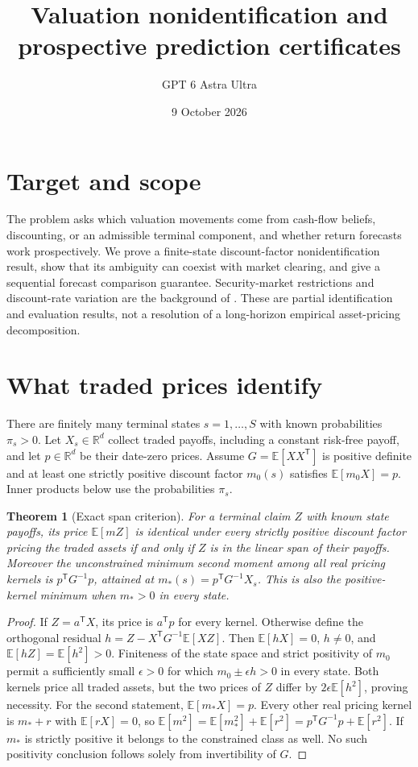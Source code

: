 \documentclass[11pt]{article}
\title{Valuation nonidentification and prospective prediction certificates}
\author{GPT 6 Astra Ultra}
\date{9 October 2026}
\newtheorem{theorem}{Theorem}
\theoremstyle{definition}
\begin{document}
\maketitle
\section*{Target and scope}
The problem asks which valuation movements come from cash-flow beliefs,
discounting, or an admissible terminal component, and whether return forecasts
work prospectively. We prove a finite-state discount-factor nonidentification
result, show that its ambiguity can coexist with market clearing, and give
a sequential forecast comparison guarantee. Security-market restrictions
and discount-rate variation are the background of \cite{hj,cochrane}.
These are partial identification and evaluation results, not a resolution
of a long-horizon empirical asset-pricing decomposition.

\section*{What traded prices identify}
There are finitely many terminal states $s=1,\ldots,S$ with known probabilities
$\pi_s>0$. Let $X_s\in\mathbb R^d$ collect traded payoffs, including a
constant risk-free payoff, and let $p\in\mathbb R^d$ be their date-zero
prices. Assume $G=\mathbb E[XX^{\mathsf T}]$ is positive definite and at
least one strictly positive discount factor $m_0(s)$ satisfies
$\mathbb E[m_0X]=p$. Inner products below use the probabilities $\pi_s$.

\begin{theorem}[Exact span criterion]
For a terminal claim $Z$ with known state payoffs, its price
$\mathbb E[mZ]$ is identical under every strictly positive discount factor
pricing the traded assets if and only if $Z$ is in the linear span of their
payoffs. Moreover the unconstrained minimum second moment among all real
pricing kernels is $p^{\mathsf T}G^{-1}p$, attained at
$m_*(s)=p^{\mathsf T}G^{-1}X_s$. This is also the positive-kernel minimum
when $m_*>0$ in every state.
\end{theorem}
\begin{proof}
If $Z=a^{\mathsf T}X$, its price is $a^{\mathsf T}p$ for every kernel.
Otherwise define the orthogonal residual
$h=Z-X^{\mathsf T}G^{-1}\mathbb E[XZ]$. Then
$\mathbb E[hX]=0$, $h\ne0$, and
$\mathbb E[hZ]=\mathbb E[h^2]>0$. Finiteness of the state space and
strict positivity of $m_0$ permit a sufficiently small $\epsilon>0$ for
which $m_0\pm\epsilon h>0$ in every state. Both kernels price all traded
assets, but the two prices of $Z$ differ by
$2\epsilon\mathbb E[h^2]$, proving necessity.
For the second statement, $\mathbb E[m_*X]=p$. Every other real pricing
kernel is $m_*+r$ with $\mathbb E[rX]=0$, so
$\mathbb E[m^2]=\mathbb E[m_*^2]+\mathbb E[r^2]
=p^{\mathsf T}G^{-1}p+\mathbb E[r^2]$.
If $m_*$ is strictly positive it belongs to the constrained class as well.
No such positivity conclusion follows solely from invertibility of $G$.
\end{proof}
\end{document}
